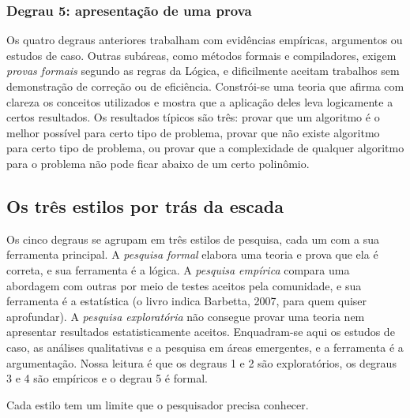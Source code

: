 \documentclass[10pt,a4paper]{extarticle}
\theoremstyle{definition}
\begin{document}
\subsubsection*{Degrau 5: apresentação de uma prova}

Os quatro degraus anteriores trabalham com evidências empíricas, argumentos ou estudos de caso. Outras subáreas, como métodos formais e compiladores, exigem \emph{provas formais} segundo as regras da Lógica, e dificilmente aceitam trabalhos sem demonstração de correção ou de eficiência. Constrói-se uma teoria que afirma com clareza os conceitos utilizados e mostra que a aplicação deles leva logicamente a certos resultados. Os resultados típicos são três: provar que um algoritmo é o melhor possível para certo tipo de problema, provar que não existe algoritmo para certo tipo de problema, ou provar que a complexidade de qualquer algoritmo para o problema não pode ficar abaixo de um certo polinômio.

\subsection{Os três estilos por trás da escada}

Os cinco degraus se agrupam em três estilos de pesquisa, cada um com a sua ferramenta principal. A \emph{pesquisa formal} elabora uma teoria e prova que ela é correta, e sua ferramenta é a lógica. A \emph{pesquisa empírica} compara uma abordagem com outras por meio de testes aceitos pela comunidade, e sua ferramenta é a estatística (o livro indica Barbetta, 2007, para quem quiser aprofundar). A \emph{pesquisa exploratória} não consegue provar uma teoria nem apresentar resultados estatisticamente aceitos. Enquadram-se aqui os estudos de caso, as análises qualitativas e a pesquisa em áreas emergentes, e a ferramenta é a argumentação. Nossa leitura é que os degraus 1 e 2 são exploratórios, os degraus 3 e 4 são empíricos e o degrau 5 é formal.

Cada estilo tem um limite que o pesquisador precisa conhecer.
\end{document}
